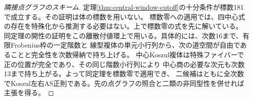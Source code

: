 \begin{proof}[隣接点グラフのスキーム]
定理\ref{thm:central-window-cutoff}の十分条件が標数181で成立する。その証明は体の標数を用いない。
標数零への適用では、四中心式の存在を特殊化から推測する必要はない。上で標数零の式を先に解いている。
同定理の開性の証明をこの離散付値環上で用いる。具体的には、次数16まで、有限Frobenius枠の一定階数と
線型複体の単元小行列から、次の道空間が自由であることと完全性を次数帰納で持ち上げる。
中心Koszul複体は特殊ファイバーで正の位置が完全であり、その同じ階数小行列により
中心商の必要な次元も次数13まで持ち上がる。よって同定理を標数零で適用でき、
二候補はともに全次数でKoszul左右AS正則である。先の点グラフの照合と二類の非同型性を併せれば主張を得る。
\end{proof}
